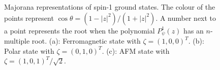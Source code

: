 \begin{figure}
    \centering
    \caption[Majorana representation of spin-1 ground states]
    {\label{fig: spin-1-majorana}Majorana representations of spin-1 ground
    states. The colour of the points represent \(\cos\theta =
    (1-|z|^2)/(1+|z|^2)\).
    A number next to a point represents the root when the polynomial
    \(P_\psi^1(z)\) has an \(n\)-multiple root.
    (a): Ferromagnetic state with \(\zeta={(1, 0, 0)}^T\).
    (b): Polar state with \(\zeta={(0, 1, 0)}^T\).
    (c): AFM state with \(\zeta={(1, 0, 1)}^T/\sqrt{2}\).}
\end{figure}

